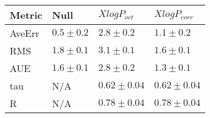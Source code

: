 \begin{tabular}{| l |l |l | l |} 
\hline 
Metric & Null  & $XlogP_{oct}$ & $XlogP_{corr}$ \\ 
\hline 
AveErr & $ 0.5 \pm 0.2 $ & $ 2.8 \pm 0.2 $ & $ 1.1 \pm 0.2 $ \\ 
RMS & $ 1.8 \pm 0.1 $ & $ 3.1 \pm 0.1 $ & $ 1.6 \pm 0.1 $ \\ 
AUE & $ 1.6 \pm 0.1 $ & $ 2.8 \pm 0.2 $ & $ 1.3 \pm 0.1 $ \\ 
tau & N/A & $ 0.62 \pm 0.04 $ & $ 0.62 \pm 0.04 $ \\ 
R & N/A & $ 0.78 \pm 0.04 $ & $ 0.78 \pm 0.04 $ \\ 
\hline
\end{tabular}

